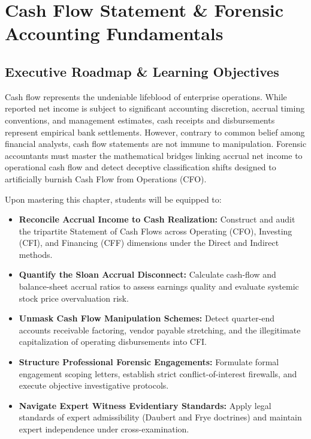 \chapter{Cash Flow Statement \& Forensic Accounting Fundamentals}

\section{Executive Roadmap \& Learning Objectives}

Cash flow represents the undeniable lifeblood of enterprise operations. While reported net income is subject to significant accounting discretion, accrual timing conventions, and management estimates, cash receipts and disbursements represent empirical bank settlements. However, contrary to common belief among financial analysts, cash flow statements are not immune to manipulation. Forensic accountants must master the mathematical bridges linking accrual net income to operational cash flow and detect deceptive classification shifts designed to artificially burnish Cash Flow from Operations (CFO).

\begin{tcolorbox}[colback=primarylight, colframe=primarydark, title={\textbf{Core Learning Competencies}}]
Upon mastering this chapter, students will be equipped to:
\begin{itemize}
    \item \textbf{Reconcile Accrual Income to Cash Realization:} Construct and audit the tripartite Statement of Cash Flows across Operating (CFO), Investing (CFI), and Financing (CFF) dimensions under the Direct and Indirect methods.
    \item \textbf{Quantify the Sloan Accrual Disconnect:} Calculate cash-flow and balance-sheet accrual ratios to assess earnings quality and evaluate systemic stock price overvaluation risk.
    \item \textbf{Unmask Cash Flow Manipulation Schemes:} Detect quarter-end accounts receivable factoring, vendor payable stretching, and the illegitimate capitalization of operating disbursements into CFI.
    \item \textbf{Structure Professional Forensic Engagements:} Formulate formal engagement scoping letters, establish strict conflict-of-interest firewalls, and execute objective investigative protocols.
    \item \textbf{Navigate Expert Witness Evidentiary Standards:} Apply legal standards of expert admissibility (Daubert and Frye doctrines) and maintain expert independence under cross-examination.
\end{itemize}
\end{tcolorbox}

